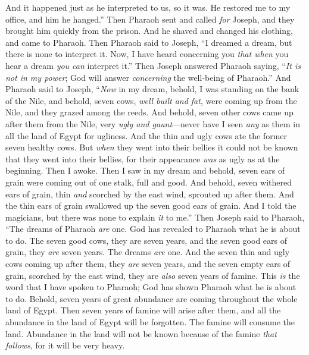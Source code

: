 \begin{biblechapter}
\verse And it happened just as he interpreted to us, so it was. He restored me to my office, and him he hanged.”
\verse Then Pharaoh sent and called \textit{for} Joseph, and they brought him quickly from the prison. And he shaved and changed his clothing, and came to Pharaoh.
\verse Then Pharaoh said to Joseph, “I dreamed a dream, but there is none to interpret it. Now, I have heard concerning you \textit{that when} you hear a dream \textit{you can} interpret it.”
\verse Then Joseph answered Pharaoh saying, “\textit{It is not in my power}; God will answer \textit{concerning} the well-being of Pharaoh.”
\verse And Pharaoh said to Joseph, “\textit{Now} in my dream, behold, I was standing on the bank of the Nile,
\verse and behold, seven cows, \textit{well built and fat}, were coming up from the Nile, and they grazed among the reeds.
\verse And behold, seven other cows came up after them from the Nile, very \textit{ugly and gaunt}—never have I seen \textit{any} as them in all the land of Egypt for ugliness.
\verse And the thin and ugly cows ate the former seven healthy cows.
\verse But \textit{when} they went into their bellies it could not be known that they went into their bellies, for their appearance \textit{was} as ugly as at the beginning. Then I awoke.
\verse Then I saw in my dream and behold, seven ears of grain were coming out of one stalk, full and good.
\verse And behold, seven withered ears of grain, thin \textit{and} scorched by the east wind, sprouted up after them.
\verse And the thin ears of grain swallowed up the seven good ears of grain. And I told the magicians, but there was none to explain \textit{it} to me.”
\verse Then Joseph said to Pharaoh, “The dreams of Pharaoh \textit{are} one. God has revealed to Pharaoh what he is about to do.
\verse The seven good cows, they are seven years, and the seven good ears of grain, they \textit{are} seven years. The dreams \textit{are} one.
\verse And the seven thin and ugly cows coming up after them, they \textit{are} seven years, and the seven empty ears of grain, scorched by the east wind, they are \textit{also} seven years of famine.
\verse This \textit{is} the word that I have spoken to Pharaoh; God has shown Pharaoh what he is about to do.
\verse Behold, seven years of great abundance are coming throughout the whole land of Egypt.
\verse Then seven years of famine will arise after them, and all the abundance in the land of Egypt will be forgotten. The famine will consume the land.
\verse Abundance in the land will not be known because of the famine \textit{that follows}, for it will be very heavy.

\end{biblechapter}
